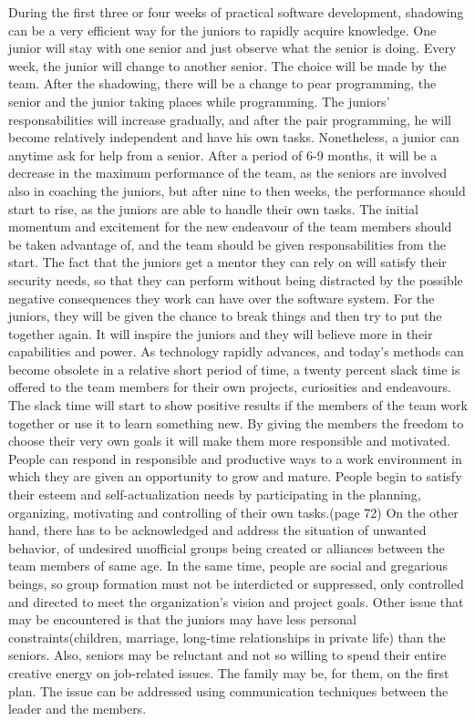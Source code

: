 \documentclass[conference]{IEEEtran}
\begin{document}
During the first three or four weeks of practical software development, shadowing can be a very efficient way for the juniors to rapidly acquire knowledge. One junior will stay with one senior and just observe what the senior is doing. Every week, the junior will change to another senior. The choice will be made by the team. After the shadowing, there will be a change to pear programming, the senior and the junior taking places while programming. The juniors' responsabilities will increase gradually, and after the pair programming, he will become relatively independent and have his own tasks. Nonetheless, a junior can anytime ask for help from a senior. After a period of 6-9 months, it will be a decrease in the maximum performance of the team, as the seniors are involved also in coaching the juniors, but after nine to then weeks, the performance should start to rise, as the juniors are able to handle their own tasks. 
\newline\indent
The initial momentum and excitement for the new endeavour of the team members should be taken advantage of, and the team should be given responsabilities from the start. The fact that the juniors get a mentor they can rely on will satisfy their security needs, so that they can perform without being distracted by the possible negative consequences they work can have over the software system.
For the juniors, they will be given the chance to break things and then try to put the together again. It will inspire the juniors and they will believe more in their capabilities and power.
\newline\indent
As technology rapidly advances, and today's methods can become obsolete in a relative short period of time, a twenty percent slack time is offered to the team members for their own projects, curiosities and endeavours. The slack time will start to show positive results if the members of the team work together or use it to learn something new. By giving the members the freedom to choose their very own goals it will make them more responsible and motivated. People can respond in responsible and productive ways to a work environment in which they are given an opportunity to grow and mature. People begin to satisfy their esteem and self-actualization needs by participating in the planning, organizing, motivating and controlling of their own tasks.(page 72)
\newline\indent
On the other hand, there has to be acknowledged and address the situation of unwanted behavior, of undesired unofficial groups being created or alliances between the team members of same age. In the same time, people are social and gregarious beings, so group formation must not be interdicted or suppressed, only controlled and directed to meet the organization's vision and project goals.
\newline\indent
Other issue that may be encountered is that the juniors may have less personal constraints(children, marriage, long-time relationships in private life) than the seniors. Also, seniors may be reluctant and not so willing to spend their entire creative energy on job-related issues. The family may be, for them, on the first plan. The issue can be addressed using communication techniques between the leader and the members.
\end{document}

